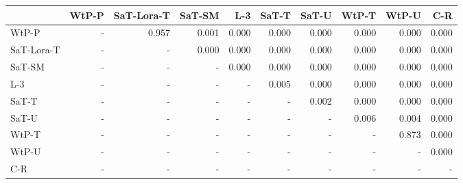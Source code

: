 \begin{tabular}{lrrrrrrrrr}
\toprule
 & WtP-P & SaT-Lora-T & SaT-SM & L-3 & SaT-T & SaT-U & WtP-T & WtP-U & C-R \\
\midrule
WtP-P & - & 0.957 & 0.001 & 0.000 & 0.000 & 0.000 & 0.000 & 0.000 & 0.000 \\
SaT-Lora-T & - & - & 0.000 & 0.000 & 0.000 & 0.000 & 0.000 & 0.000 & 0.000 \\
SaT-SM & - & - & - & 0.000 & 0.000 & 0.000 & 0.000 & 0.000 & 0.000 \\
L-3 & - & - & - & - & 0.005 & 0.000 & 0.000 & 0.000 & 0.000 \\
SaT-T & - & - & - & - & - & 0.002 & 0.000 & 0.000 & 0.000 \\
SaT-U & - & - & - & - & - & - & 0.006 & 0.004 & 0.000 \\
WtP-T & - & - & - & - & - & - & - & 0.873 & 0.000 \\
WtP-U & - & - & - & - & - & - & - & - & 0.000 \\
C-R & - & - & - & - & - & - & - & - & - \\
\bottomrule
\end{tabular}

